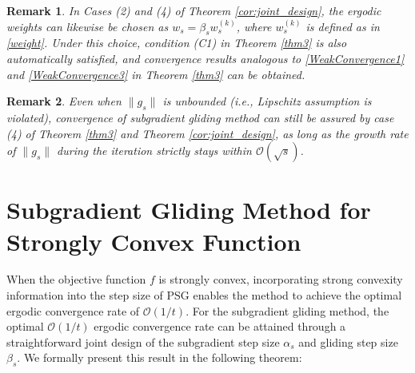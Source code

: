 \documentclass[sn-mathphys]{JORSC-jnl}%
\theoremstyle{thmstyleone}%
\newtheorem{theorem}{Theorem}[section]%
\newtheorem{remark}{Remark}[section]%
\newtheorem{corollary}{Corollary}[section]%
\theoremstyle{thmstylethree}%
\begin{document}
\begin{remark}
	In Cases (2) and (4) of Theorem \ref{cor:joint_design}, the ergodic weights can likewise be chosen as $w_s = \beta_s w_s^{(k)}$, where $w_s^{(k)}$ is defined as in \eqref{weight}. Under this choice, condition (C1) in Theorem \ref{thm3} is also automatically satisfied, and convergence results analogous to \eqref{WeakConvergence1} and \eqref{WeakConvergence3} in Theorem \ref{thm3} can be obtained.
\end{remark}

\begin{remark}\label{r5}
	Even when $\|g_s\|$ is unbounded (i.e., Lipschitz assumption is violated), convergence of subgradient gliding method can still be assured by case (4) of Theorem \ref{thm3} and Theorem \ref{cor:joint_design}, as long as the growth rate of $\|g_s\|$ during the iteration strictly stays  within $\mathcal{O}(\sqrt{s})$.
\end{remark}



\section{Subgradient Gliding Method for Strongly Convex Function}
When the objective function $f$ is strongly convex, incorporating strong convexity information into the step size of PSG enables the method to achieve the optimal ergodic convergence rate of $\mathcal{O}(1/t)$. For the subgradient gliding method, the optimal $\mathcal{O}(1/t)$ ergodic convergence rate can be attained through a straightforward joint design of the subgradient step size $\alpha_s$ and gliding step size $\beta_s$. We formally present this result in the following theorem:

\end{document}
